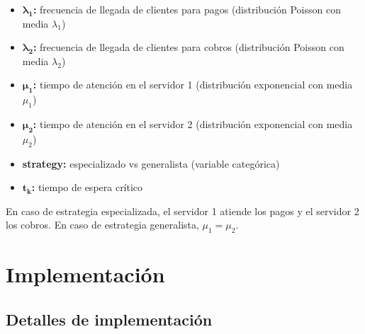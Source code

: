 \documentclass[letterpaper, 12pt]{report}
\begin{document}
\begin{itemize}
    \item \(\mathbf{\lambda_1}\)\textbf{:} frecuencia de llegada de clientes para pagos (distribución Poisson con media $\lambda_1$)
    \item \(\mathbf{\lambda_2}\)\textbf{:} frecuencia de llegada de clientes para cobros (distribución Poisson con media $\lambda_2$)    
    \item \(\mathbf{\mu_1}\)\textbf{:} tiempo de atención en el servidor 1 (distribución exponencial con media $\mu_1$)
    \item \(\mathbf{\mu_2}\)\textbf{:} tiempo de atención en el servidor 2 (distribución exponencial con media $\mu_2$)
    \item \textbf{strategy:} especializado vs generalista (variable categórica)
    \item \(\mathbf{t_k}\)\textbf{:} tiempo de espera crítico 
\end{itemize}

En caso de estrategia especializada, el servidor 1 atiende los pagos y el servidor 2 los cobros. En caso de estrategia generalista, $\mu_1 = \mu_2$.



\chapter{Implementación}

\section{Detalles de implementación}
\end{document}
